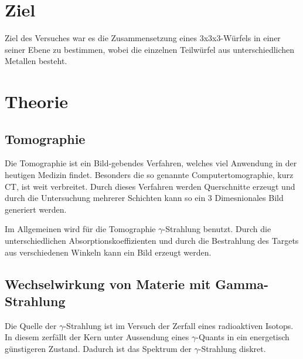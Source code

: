 \section{Ziel}
Ziel des Versuches war es die Zusammensetzung eines 3x3x3-Würfels in einer seiner Ebene zu bestimmen, wobei die einzelnen Teilwürfel aus unterschiedlichen Metallen besteht. 

\section{Theorie}
\subsection{Tomographie}
Die Tomographie ist ein Bild-gebendes Verfahren, welches viel Anwendung in der heutigen Medizin findet. Besonders die so genannte Computertomographie, kurz CT, ist weit 
verbreitet.
Durch dieses Verfahren werden Querschnitte erzeugt und durch die Untersuchung mehrerer Schichten kann so ein 3 Dimesnionales Bild generiert werden.

\noindent
Im Allgemeinen wird für die Tomographie $\gamma$-Strahlung benutzt. Durch die unterschiedlichen Absorptionskoeffizienten und durch die Bestrahlung des Targets aus 
verschiedenen Winkeln kann ein Bild erzeugt werden.

\subsection{Wechselwirkung von Materie mit Gamma-Strahlung}
Die Quelle der $\gamma$-Strahlung ist im Versuch der Zerfall eines radioaktiven Isotops. In diesem zerfällt
der Kern unter Aussendung eines $\gamma$-Quants in ein energetisch günstigeren Zustand. Dadurch ist das 
Spektrum der $\gamma$-Strahlung diskret.

